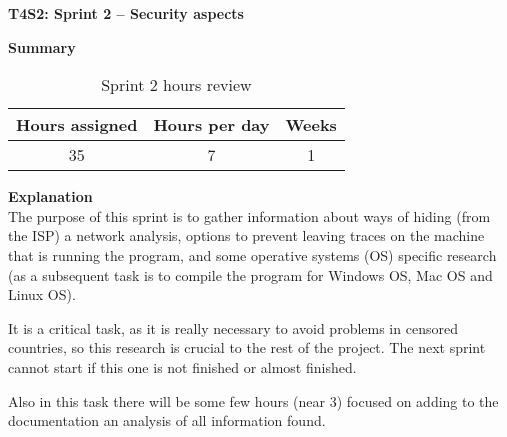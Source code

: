 \textbf{T4S2: Sprint 2 – Security aspects}

\textbf{Summary}
\begin{table}[ht]
\centering
  \begin{tabular}{| c | c | c |}
  \hline Hours assigned & Hours per day & Weeks \\ \hline  
   35 & 7 & 1        \\ \hline
  \end{tabular}
  \caption{Sprint 2 hours review} \vspace{3pt}
  \label{tab:sprint2}
\end{table}


\textbf{Explanation}\\
The purpose of this sprint is to gather information about ways of hiding (from the ISP) a network analysis, options to prevent leaving traces on the machine that is running the program, and some operative systems (OS) specific research (as a subsequent task is to compile the program for Windows OS, Mac OS and Linux OS).

It is a critical task, as it is really necessary to avoid problems in censored countries, so this research is crucial to the rest of the project. The next sprint cannot start if this one is not finished or almost finished.

Also in this task there will be some few hours (near 3) focused on adding to the documentation an analysis of all information found.
